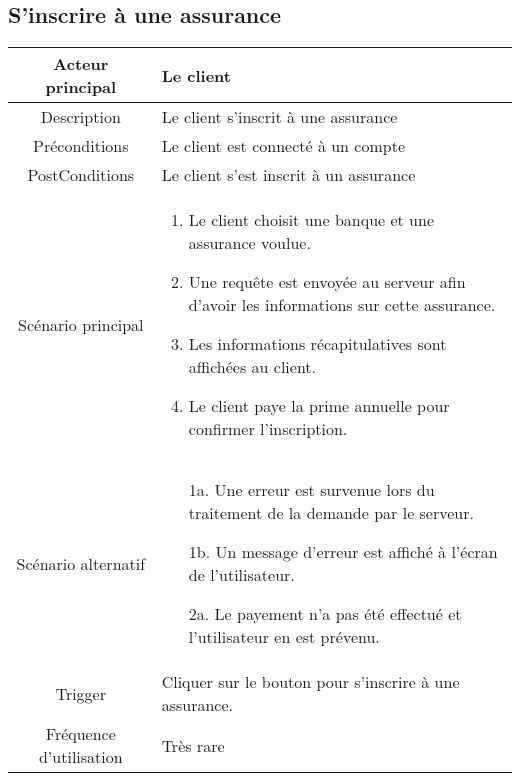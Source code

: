 \documentclass[]{article}
\begin{document}
\subsection{S'inscrire à une assurance}
\begin{table}[h]
    \begin{tabular}{|c|p{10cm}|}
       \hline
       Acteur principal&Le client\\
       \hline
       Description&Le client s'inscrit à une assurance\\
       \hline
       Préconditions&Le client est connecté à un compte\\
       \hline
       PostConditions&Le client s'est inscrit à un assurance\\
       \hline
       Scénario principal& 
             \begin{enumerate}
                \item Le client choisit une banque et une assurance voulue.
                \item Une requête est envoyée au serveur afin d'avoir les informations sur cette assurance.
                \item Les informations récapitulatives sont affichées au client.
                \item Le client paye la prime annuelle pour confirmer l'inscription.
             \end{enumerate}     \\
       \hline
       Scénario alternatif& 
       \begin{itemize}
        \item[1a.] Une erreur est survenue lors du traitement de la demande par le serveur.
        \item[1b.] Un message d'erreur est affiché à l'écran de l'utilisateur. 
        \item[2a.] Le payement n'a pas été effectué et l'utilisateur en est prévenu.
    \end{itemize}
         \\
       \hline
       Trigger&Cliquer sur le bouton pour s'inscrire à une assurance.\\
       \hline
       Fréquence d'utilisation&Très rare\\
       \hline
    \end{tabular}
 \end{table}


\newpage

\end{document}
